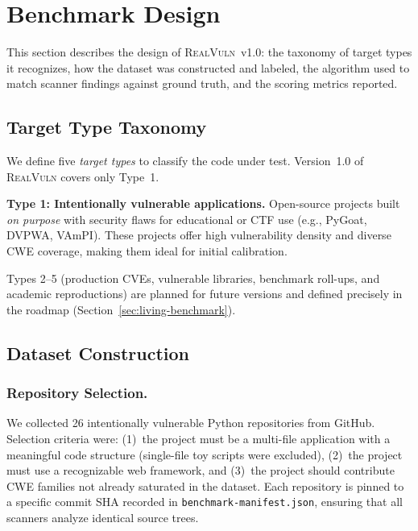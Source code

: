 \section{Benchmark Design}
\label{sec:benchmark-design}

This section describes the design of \textsc{RealVuln}~v1.0: the taxonomy of target types it recognizes, how the dataset was constructed and labeled, the algorithm used to match scanner findings against ground truth, and the scoring metrics reported.

\subsection{Target Type Taxonomy}
\label{sec:target-types}

We define five \emph{target types} to classify the code under test.
Version~1.0 of \textsc{RealVuln} covers only Type~1.

\medskip
\noindent\textbf{Type 1: Intentionally vulnerable applications.}
Open-source projects built \emph{on purpose} with security flaws for educational or CTF use (e.g., PyGoat, DVPWA, VAmPI).
These projects offer high vulnerability density and diverse CWE coverage, making them ideal for initial calibration.

\medskip
\noindent Types 2--5 (production CVEs, vulnerable libraries, benchmark roll-ups, and academic reproductions) are planned for future versions and defined precisely in the roadmap (Section~\ref{sec:living-benchmark}).

\subsection{Dataset Construction}
\label{sec:dataset-construction}

\subsubsection{Repository Selection.}
We collected 26 intentionally vulnerable Python repositories from GitHub.
Selection criteria were: (1)~the project must be a multi-file application with a meaningful code structure (single-file toy scripts were excluded), (2)~the project must use a recognizable web framework, and (3)~the project should contribute CWE families not already saturated in the dataset.
Each repository is pinned to a specific commit SHA recorded in \texttt{benchmark-manifest.json}, ensuring that all scanners analyze identical source trees.

